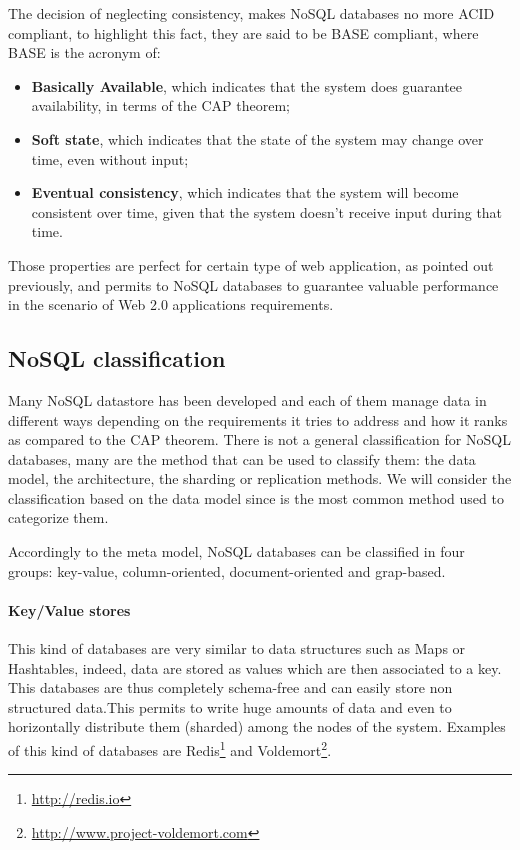 \noindent The decision of neglecting consistency, makes NoSQL databases no more ACID compliant, to highlight this fact, they are said to be BASE compliant, where BASE is the acronym of:
\begin{itemize}
\item \textbf{Basically Available}, which indicates that the system does guarantee availability, in terms of the CAP theorem;
\item \textbf{Soft state}, which indicates that the state of the system may change over time, even without input;
\item \textbf{Eventual consistency}, which indicates that the system will become consistent over time, given that the system doesn't receive input during that time.
\end{itemize}
\noindent Those properties are perfect for certain type of web application, as pointed out previously, and permits to NoSQL databases to guarantee valuable performance in the scenario of Web 2.0 applications requirements.

\subsection{NoSQL classification}
Many NoSQL datastore has been developed and each of them manage data in different ways depending on the requirements it tries to address and how it ranks as compared to the CAP theorem.
There is not a general classification for NoSQL databases, many are the method that can be used to classify them: the data model, the architecture, the sharding or replication methods. We will consider the classification based on the data model since is the most common method used to categorize them.

\noindent Accordingly to the meta model, NoSQL databases can be classified in four groups: key-value, column-oriented, document-oriented and grap-based.

\paragraph{Key/Value stores} This kind of databases are very similar to data structures such as Maps or Hashtables, indeed, data are stored as values which are then associated to a key. This databases are thus completely schema-free and can easily store non structured data.This permits to write huge amounts of data and even to horizontally distribute them (sharded) among the nodes of the system.
Examples of this kind of databases are Redis\footnote{\url{http://redis.io}} and Voldemort\footnote{\url{http://www.project-voldemort.com}}.

